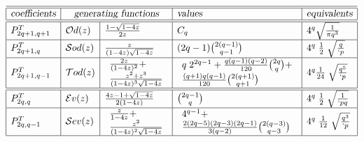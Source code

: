 \documentclass[preprint,authoryear]{elsarticle}
\newcommand{\Od}{\mathcal{O}d}
\newcommand{\Sod}{\mathcal{S}od}
\newcommand{\Tod}{\mathcal{T}od}
\newcommand{\Ev}{\mathcal{E}v}
\newcommand{\Sev}{\mathcal{S}ev}
\begin{document}
\begin{displaymath}
\begin{array}{|l|l|l|l|l|}
\hline\hline
\textsl{coefficients}&\multicolumn{2}{c|}{\textsl{generating functions}}& \textsl{values} & \textsl{equivalents}\\
\hline\hline
P^T_{2q+1,q+1}&\Od(z)& \frac{1-\sqrt{1-4z}}{2z}&C_q& 4^q\sqrt{\frac{1}{\pi q^3}}\\ \hline
P^T_{2q+1,q}&\Sod(z) & \frac{z}{(1-4z)\sqrt{1-4z}}&
(2q-1) {2(q-1)\choose q-1}& 4^q\;\frac{1}{2}\;\sqrt{\frac{q}{`p}}\\ 
\hline
P^T_{2q+1,q-1} & \Tod(z)& \begin{array}{l}
  \frac{2z}{(1-4z)^2} +\\[2pt]
  \frac{z^2+z^3}{(1-4z)^3\sqrt{1-4z}}
\end{array}
&
\begin{array}{l}
q\;2^{2q-1} +\frac{q(q-1)(q-2)}{120}{2q\choose q}+\\[2pt]
\frac{(q+1)q(q-1)}{120}{2(q+1) \choose q+1}\\[2pt]
\end{array}
& 4^q\frac{1}{24}\;\sqrt{\frac{q^5}{`p}}
\\
\hline\hline
P^T_{2q,q}&\Ev(z) &  \frac{4z-1 + \sqrt{1-4z}}{2(1-4z)} & { 2q-1 \choose
  q}&4^q\;\frac{1}{2}\;\sqrt{\frac{1}{`p q}}\\[2pt]  \hline
P^T_{2q,q-1}&\Sev(z) &
\begin{array}{l}
\frac{z}{1-4z} +\\ \frac{z^2}{(1-4z)^2\sqrt{1-4z}}
\end{array}
& \begin{array}{l}4^{q-1} +\\ \frac{2 (2q - 5)  (2q - 3)  (2q
  -1)}{3(q-2)}  {2(q-3) \choose q-3}
\end{array}
& 4^q\;\frac{1}{12}\;\sqrt{\frac{q^3}{`p}}\\\hline
\end{array}
\end{displaymath}
\end{document}
